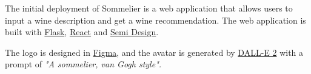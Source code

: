 \documentclass[
	a4paper,
	fontsize=10pt, %
	twoside=false, %
	secnumdepth=2, %
]{kaohandt}
\begin{document}
The initial deployment of Sommelier is a web application that allows users to input a wine description and get a wine recommendation. The web application is built with \href{https://flask.palletsprojects.com/}{Flask}, \href{https://reactjs.org/}{React} and \href{https://semi.design/en-US}{Semi Design}.

The logo is designed in \href{https://www.figma.com/}{Figma}, and the avatar is generated by \href{https://openai.com/dall-e-2/}{DALL-E 2} with a prompt of \textit{"A sommelier, van Gogh style".}
\end{document}
